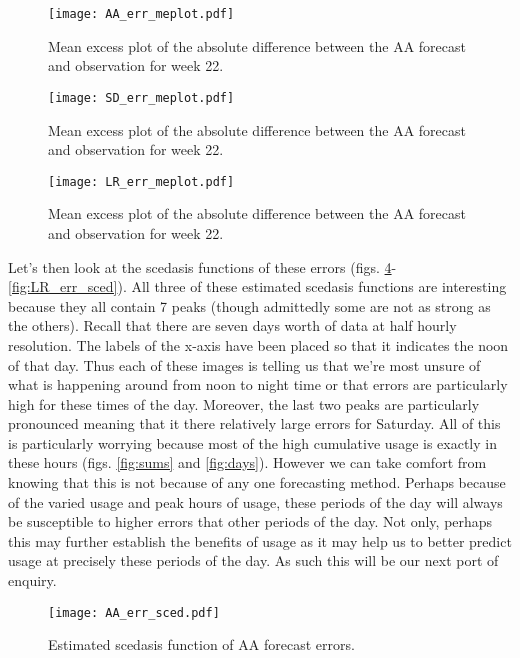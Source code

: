 \documentclass[a4paper]{article}
\begin{document}
\begin{figure}
\centering
\texttt{[image: AA\_err\_meplot.pdf]}
\caption{\label{fig:AA_err_me} Mean excess plot of the absolute difference between the AA forecast and observation for week 22.}
\end{figure}

\begin{figure}
\centering
\texttt{[image: SD\_err\_meplot.pdf]}
\caption{\label{fig:SD_err_me} Mean excess plot of the absolute difference between the AA forecast and observation for week 22.}
\end{figure}

\begin{figure}
\centering
\texttt{[image: LR\_err\_meplot.pdf]}
\caption{\label{fig:LR_err_me} Mean excess plot of the absolute difference between the AA forecast and observation for week 22.}
\end{figure}

Let's then look at the scedasis functions of these errors (figs. \ref{fig:AA_err_sced}- \ref{fig:LR_err_sced}). All three of these estimated scedasis functions are interesting because they all contain 7 peaks (though admittedly some are not as strong as the others). Recall that there are seven days worth of data at half hourly resolution. The labels of the x-axis have been placed so that it indicates the noon of that day. Thus each of these images is telling us that we're most unsure of what is happening around from noon to night time or that errors are particularly high for these times of the day. Moreover, the last two peaks are particularly pronounced meaning that it there relatively large errors for Saturday. All of this is particularly worrying because most of the high cumulative usage is exactly in these hours (figs. \ref{fig:sums} and \ref{fig:days}). However we can take comfort from knowing that this is not because of any one forecasting method. Perhaps because of the varied usage and peak hours of usage, these periods of the day will always be susceptible to higher errors that other periods of the day. Not only, perhaps this may further establish the benefits of usage as it may help us to better predict usage at precisely these periods of the day. As such this will be our next port of enquiry.

\begin{figure}
\centering
\texttt{[image: AA\_err\_sced.pdf]}
\caption{\label{fig:AA_err_sced} Estimated scedasis function of AA forecast errors.}
\end{figure}
\end{document}
